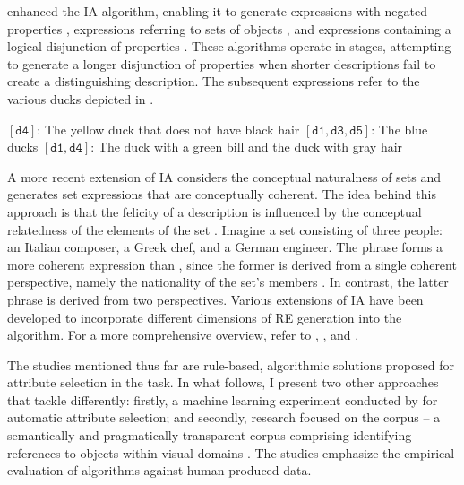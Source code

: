  enhanced the IA algorithm, enabling it to generate expressions with negated properties , expressions referring to sets of objects , and expressions containing a logical disjunction of properties . These algorithms operate in stages, attempting to generate a longer disjunction of properties when shorter descriptions fail to create a distinguishing description. The subsequent expressions refer to the various ducks depicted in .

\begin{exe}
\ex\label{ex:negation} $[\texttt{d4}]$: The yellow duck that does not have black hair
\ex\label{ex:set} $[\texttt{d1}, \texttt{d3}, \texttt{d5}]$: The blue ducks
\ex\label{ex:disjunct} $[\texttt{d1},\texttt{d4}]$: The duck with a green bill and the duck with gray hair
\end{exe}

A more recent extension of IA considers the conceptual naturalness of sets and generates set expressions that are conceptually coherent. The idea behind this approach is that the felicity of a description is influenced by the conceptual relatedness of the elements of the set \citep{gatt2007lexical}. Imagine a set consisting of three people: an Italian composer, a Greek chef, and a German engineer. The phrase  forms a more coherent expression than , since the former is derived from a single coherent perspective, namely the nationality of the set's members \citep{gatt2007lexical}. In contrast, the latter phrase is derived from two perspectives. Various extensions of IA have been developed to incorporate different dimensions of RE generation into the algorithm. For a more comprehensive overview, refer to \citet{viethen2011generation}, \citet{krahmer2012computational}, and \citet{van2019compref}.

The studies mentioned thus far are rule-based, algorithmic solutions proposed for attribute selection in the \shot task. In what follows, I present two other approaches that tackle \shot differently: firstly, a machine learning experiment conducted by \citet{jordan2005learning2} for automatic attribute selection; and secondly, research focused on the  corpus -- a semantically and pragmatically transparent corpus comprising identifying references to objects within visual domains \citep{van2006building}. The  studies emphasize the empirical evaluation of \shot algorithms against human-produced data.

